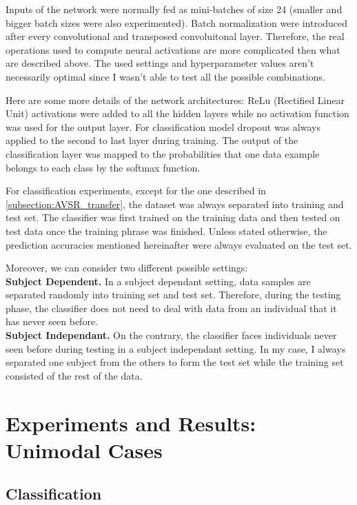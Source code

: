Inputs of the network were normally fed as mini-batches of size 24
(smaller and bigger batch sizes were also experimented).
Batch normalization \cite{S. Ioffe 2015} were introduced after every
convolutional and transposed convoluitonal layer. Therefore, the real
operations used to compute neural activations are more complicated
then what are described above. The used settings and hyperparameter
values aren't necessarily optimal since I wasn't able to test all the
possible combinations.

Here are some more details of the network architectures: ReLu
(Rectified Linear Unit) activations were added to all the hidden layers
\cite{A. Krizhevsky 2012} while no activation function was used for
the output layer.
For classification model dropout \cite{N. Srivastava 2014}
was always applied to the second to last layer during training.
The output of the classification layer was mapped to the probabilities
that one data example belongs to each class by the softmax function.

For classification experiments, except for the one described in
\ref{subsection:AVSR_transfer}, the dataset was always separated into
training and test set. The classifier was first trained on the training data
and then tested on test data once the training phrase was finished.
Unless stated otherwise, the prediction accuracies mentioned hereinafter
were always evaluated on the test set.

Moreover, we can consider two different possible settings:\\[0.35em]
\textbf{Subject Dependent.}
In a subject dependant setting, data samples are separated randomly into
training set and test set. Therefore, during the
testing phase, the classifier does not need to deal with data from an
individual that it has never seen before.\\[0.35em]
\textbf{Subject Independant.}
On the contrary, the classifier faces individuals never seen before
during testing in a subject independant setting. 
In my case, I always separated one subject from the others to form
the test set while the training set consisted of the rest of the data.

\section{Experiments and Results: Unimodal Cases} \label{section:uni}

\subsection{Classification} \label{subsection:classif}

